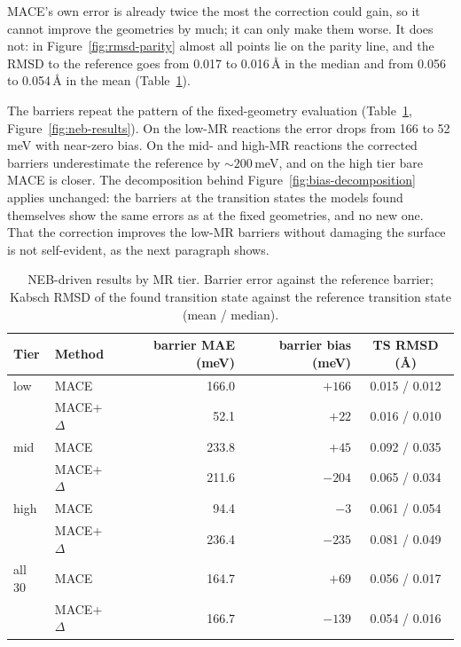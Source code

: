 MACE's own error is already twice the most the correction could
gain, so it cannot improve the geometries by much; it can only make
them worse. It does not: in Figure~\ref{fig:rmsd-parity} almost all
points lie on the parity line, and the RMSD to the reference goes
from 0.017 to 0.016\,\AA{} in the median and from 0.056 to
0.054\,\AA{} in the mean (Table~\ref{tab:delta-neb-results}).

The barriers repeat the pattern of the fixed-geometry evaluation
(Table~\ref{tab:delta-neb-results}, Figure~\ref{fig:neb-results}). On the
low-MR reactions the error drops from 166 to 52\,meV with near-zero bias.
On the mid- and high-MR reactions the corrected barriers underestimate the
reference by ${\sim}200$\,meV, and on the high tier bare MACE is closer.
The decomposition behind Figure~\ref{fig:bias-decomposition} applies
unchanged: the barriers at the transition states the models found
themselves show the same errors as at the fixed geometries, and no
new one. That the correction improves the low-MR barriers without damaging
the surface is not self-evident, as the next paragraph shows.

\begin{table}[htbp]
  \centering
  \caption{NEB-driven results by MR tier. Barrier error against
  the reference barrier; Kabsch RMSD of the found transition state against
  the reference transition state (mean / median).}
  \label{tab:delta-neb-results}
  \begin{tabular}{llrrc}
    \toprule
    Tier & Method & barrier MAE (meV) & barrier bias (meV) & TS RMSD (\AA) \\
    \midrule
    low  & MACE          & 166.0 & $+166$ & 0.015 / 0.012 \\
         & MACE+$\Delta$ &  52.1 & $+22$  & 0.016 / 0.010 \\
    \midrule
    mid  & MACE          & 233.8 & $+45$  & 0.092 / 0.035 \\
         & MACE+$\Delta$ & 211.6 & $-204$ & 0.065 / 0.034 \\
    \midrule
    high & MACE          &  94.4 & $-3$   & 0.061 / 0.054 \\
         & MACE+$\Delta$ & 236.4 & $-235$ & 0.081 / 0.049 \\
    \midrule
    all 30 & MACE          & 164.7 & $+69$  & 0.056 / 0.017 \\
           & MACE+$\Delta$ & 166.7 & $-139$ & 0.054 / 0.016 \\
    \bottomrule
  \end{tabular}
\end{table}


